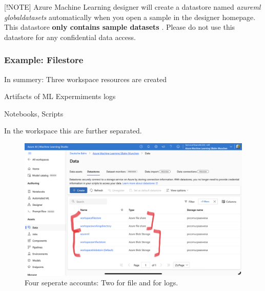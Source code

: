 [!NOTE] Azure Machine Learning designer will create a datastore named \textit{azureml globaldatasets} automatically when you open a sample in the designer homepage. This datastore \textbf{only contains sample datasets} . Please do not use this datastore for any confidential data access.

\subsubsection{Example: Filestore}
In summery: Three workspace resources are created

	\begin{description}
		\centering
		\item[blobstore (default)] Artifacts of \gls{ML} Expermiments logs
		\item[filestore] Notebooks, Scripts
		\item[azureml globaldatasets]
	\end{description}

In the workspace this are further separated.

\begin{figure}[H]
	\centering
	\includegraphics[scale = 0.1]{attachment/chapter_10/Scc036}
	\caption{Four seperate accounts: Two for file and for logs.}
\end{figure}


